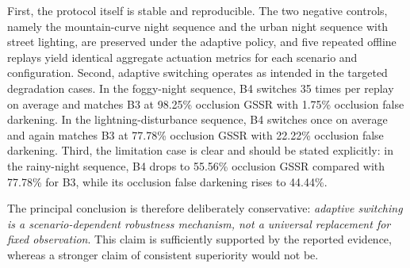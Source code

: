 \documentclass[pdflatex,sn-mathphys-num]{sn-jnl}%
\theoremstyle{thmstyleone}%
\theoremstyle{thmstyletwo}%
\theoremstyle{thmstylethree}%
\begin{document}
First, the protocol itself is stable and reproducible. The two negative
controls, namely the mountain-curve night sequence and the urban night
sequence with street lighting, are preserved under
the adaptive policy, and five repeated offline replays yield
identical aggregate actuation metrics for each scenario and
configuration. Second, adaptive switching operates as intended in
the targeted degradation cases. In the foggy-night sequence, B4 switches 35
times per replay on average and matches B3 at 98.25\% occlusion GSSR
with 1.75\% occlusion false darkening. In the lightning-disturbance sequence, B4
switches once on average and again matches B3 at 77.78\% occlusion GSSR
with 22.22\% occlusion false darkening. Third, the limitation case is
clear and should be stated explicitly: in the rainy-night sequence, B4 drops to
55.56\% occlusion GSSR compared with 77.78\% for B3, while its
occlusion false darkening rises to 44.44\%.

The principal conclusion is therefore deliberately conservative:
\emph{adaptive switching is a scenario-dependent robustness mechanism,
not a universal replacement for fixed observation}. This claim is
sufficiently supported by the reported evidence, whereas a stronger
claim of consistent superiority would not be.
\end{document}
